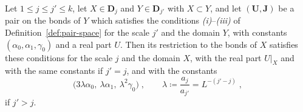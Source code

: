 \documentclass[11pt]{preprint}
\numberwithin{equation}{section}
\begin{document}
\begin{lemma}\label{lem:restriction}
Let $1 \leqslant j \leqslant j' \leqslant k$, let $X \in \mathbf D_j$ and $Y \in \mathbf D_{j'}$ with $X \subset Y$, and let $(\mathbf U, \mathbf J)$ be a pair on the bonds of $Y$ which satisfies the conditions \emph{(i)}--\emph{(iii)} of Definition~\ref{def:pair-space} for the scale $j'$ and the domain $Y$, with constants $(\alpha_0, \alpha_1, \gamma_0)$ and a real part $U$. Then its restriction to the bonds of $X$ satisfies these conditions for the scale $j$ and the domain $X$, with the real part $U|_X$ and with the same constants if $j' = j$, and with the constants
\begin{equation}\label{eq:restriction}
    \bigl(3\lambda\alpha_0,\ \lambda\alpha_1,\ \lambda^2\gamma_0\bigr)\;,
    \qquad
    \lambda \coloneqq \frac{a_j}{a_{j'}} = L^{-(j'-j)}\;,
\end{equation}
if $j' > j$.
\end{lemma}
\end{document}
